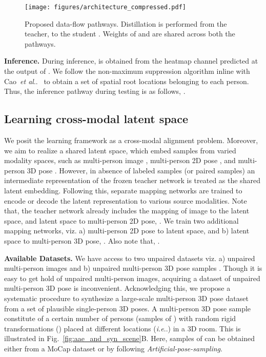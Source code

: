 \documentclass[runningheads]{llncs}
\makeatletter
\DeclareRobustCommand\onedot{\futurelet\@let@token\@onedot}
\def\@onedot{\ifx\@let@token.\else.\null\fi\xspace}
\def\ie{\emph{i.e}\onedot} \def\Ie{\emph{I.e}\onedot}
\def\etal{\emph{et al}\onedot}
\makeatother
\begin{document}
\begin{figure*}[t]
    \centering
    \texttt{[image: figures/architecture\_compressed.pdf]}
    \caption{Proposed data-flow pathways.
    Distillation is performed from the teacher,  to the student . Weights of 
     and  are shared across both the pathways.
    }
    \label{fig:architecture}
\end{figure*}

\noindent
\textbf{Inference.} During inference,  is obtained from the heatmap channel  predicted at the output of . We follow the non-maximum suppression algorithm {inline with} Cao~\etal~\cite{cao2017realtime} to obtain a set of spatial root locations belonging to each person. Thus, the inference pathway during testing is as follows, .

\subsection{Learning cross-modal latent space}

We posit the learning framework as a {cross-modal alignment} problem. Moreover, we aim to realize a shared latent space,  which embed samples from varied modality spaces, such as multi-person image , multi-person 2D pose , and multi-person 3D pose . However, in absence of labeled samples (or paired samples) an intermediate representation of the frozen teacher network is treated as the shared latent embedding. Following this, separate mapping networks are trained to encode or decode the latent representation to various source modalities. Note that, the teacher network already includes the mapping of image to the latent space,  and latent space to multi-person 2D pose, . We train two additional mapping networks, viz. a) multi-person 2D pose to latent space,  and b) latent space to multi-person 3D pose, . Also note that, .


\textbf{Available Datasets.}  
We have access to two unpaired datasets viz. a) unpaired multi-person images  and b) unpaired multi-person 3D pose samples . Though it is easy to get hold of unpaired multi-person images, acquiring a dataset of unpaired multi-person 3D pose is inconvenient. Acknowledging this, we propose a systematic procedure to synthesize a large-scale multi-person 3D pose dataset from a set of plausible single-person 3D poses. A multi-person 3D pose sample constitute of a certain number of persons (samples of ) with random rigid transformations () placed at different locations (\ie ) 
in a 3D room. This is illustrated in Fig.~\ref{fig:aae_and_syn_scene}{\color{red}B}. Here, samples of  can be obtained either from a MoCap dataset or by following \textit{Artificial-pose-sampling}.
\end{document}
